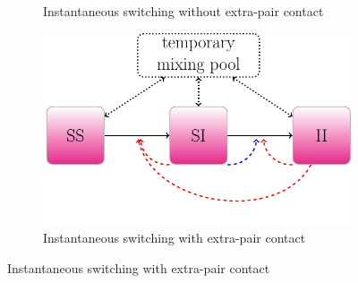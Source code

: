 \documentclass{article}
\begin{document}
\begin{figure}[t!p]

\begin{subfigure}[b]{0.5\linewidth}
	\centering
\caption{Instantaneous switching without extra-pair contact}
\end{subfigure}
\begin{subfigure}[b]{0.5\linewidth}
	\centering
	\includegraphics{tikz-f2}
\caption{Instantaneous switching with extra-pair contact}
\end{subfigure}




\end{figure}
\end{document}
